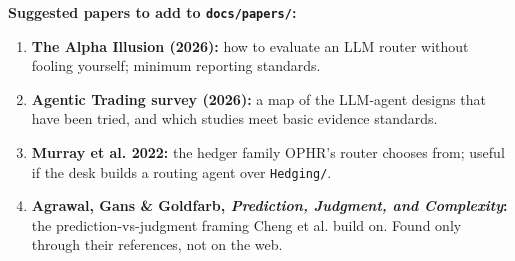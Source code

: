 \documentclass{article}
\begin{document}
\textbf{Suggested papers to add to \texttt{docs/\allowbreak{}papers/\allowbreak{}}:}

\begin{enumerate}

\item \textbf{The Alpha Illusion (2026):} how to evaluate an LLM router without fooling yourself; minimum reporting standards.

\item \textbf{Agentic Trading survey (2026):} a map of the LLM-agent designs that have been tried, and which studies meet basic evidence standards.

\item \textbf{Murray et al. 2022:} the hedger family OPHR's router chooses from; useful if the desk builds a routing agent over \texttt{Hedging/\allowbreak{}}.

\item \textbf{Agrawal, Gans \& Goldfarb, \emph{Prediction, Judgment, and Complexity}:} the prediction-vs-judgment framing Cheng et al. build on. Found only through their references, not on the web.

\end{enumerate}
\end{document}
